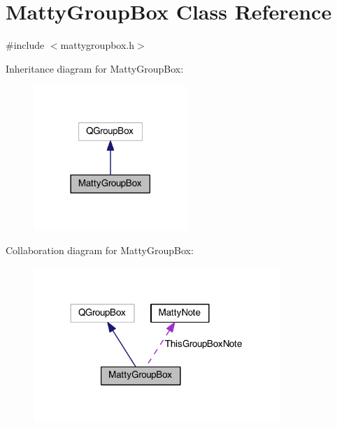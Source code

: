 \hypertarget{classMattyGroupBox}{}\section{Matty\+Group\+Box Class Reference}
\label{classMattyGroupBox}


{\ttfamily \#include $<$mattygroupbox.\+h$>$}



Inheritance diagram for Matty\+Group\+Box\+:
\nopagebreak
\begin{figure}[H]
\begin{center}
\leavevmode
\includegraphics[width=165pt]{classMattyGroupBox__inherit__graph}
\end{center}
\end{figure}


Collaboration diagram for Matty\+Group\+Box\+:
\nopagebreak
\begin{figure}[H]
\begin{center}
\leavevmode
\includegraphics[width=264pt]{classMattyGroupBox__coll__graph}
\end{center}
\end{figure}
